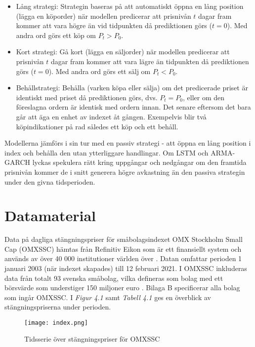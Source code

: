\documentclass[11pt]{article}
\numberwithin{equation}{section}
\numberwithin{table}{section}
\numberwithin{figure}{section}
\begin{document}
\begin{itemize}
    \item Lång strategi: Strategin baseras på att automatiskt öppna en lång position (lägga en köporder) när modellen predicerar att prisnivån $t$ dagar fram kommer att vara högre än vid tidpunkten då prediktionen görs ($t=0$). Med andra ord görs ett köp om $P_t > P_0$.
    \item Kort strategi: Gå kort (lägga en säljorder) när modellen predicerar att prisnivån $t$ dagar fram kommer att vara lägre än tidpunkten då prediktionen görs ($t=0$). Med andra ord görs ett sälj om $P_t < P_0$.
    \item Behållstrategi: Behålla (varken köpa eller sälja) om det predicerade priset är identiskt med priset då prediktionen görs, dvs. $P_t = P_0$, eller om den föreslagna ordern är identisk med ordern innan. Det senare eftersom det bara går att äga en enhet av indexet åt gången. Exempelvis blir två köpindikationer på rad således ett köp och ett behåll.
\end{itemize}

Modellerna jämförs i sin tur med en passiv strategi - att öppna en lång position i index och behålla den utan ytterliggare handlingar. Om LSTM och ARMA-GARCH lyckas spekulera rätt kring uppgångar och nedgångar om den framtida prisnivån kommer de i snitt generera högre avkastning än den passiva strategin under den givna tidsperioden.

\newpage
\section{Datamaterial}

Data på dagliga stängningspriser för småbolagsindexet OMX Stockholm Small Cap (OMXSSC) hämtas från Refinitiv Eikon som är ett finansiellt system och används av över 40 000 institutioner världen över \parencite{Eikon}. Datan omfattar perioden 1 januari 2003 (när indexet skapades) till 12 februari 2021. I OMXSSC inkluderas data från totalt 93 svenska småbolag, vilka defineras som bolag med ett börsvärde som understiger 150 miljoner euro \parencite{smabalagsdefinition}. Bilaga B specificerar alla bolag som ingår OMXSSC. I \emph{Figur 4.1} samt \textit{Tabell 4.1} ges en överblick av stängningspriserna under perioden. 

\begin{figure}[H]
\caption{Tidsserie över stängningspriser för OMXSSC}
\texttt{[image: index.png]}
\centering
\end{figure}
\end{document}
